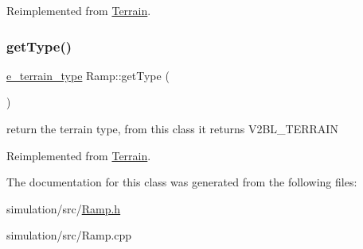 Reimplemented from \mbox{\hyperlink{class_terrain_a10fcf414cba83e769d99156fe16aa795}{Terrain}}.

\mbox{\label{class_ramp_a25dce9bce336a8524be1de1abd6f1af3}} 
\subsubsection{\texorpdfstring{get\+Type()}{getType()}}
{\footnotesize\ttfamily \mbox{\hyperlink{_terrain_8h_a6d0b7e83bb7325270c1162bece970fd8}{e\+\_\+terrain\+\_\+type}} Ramp\+::get\+Type (\begin{DoxyParamCaption}{ }\end{DoxyParamCaption})\hspace{0.3cm}{\ttfamily [virtual]}}

return the terrain type, from this class it returns V2\+B\+L\+\_\+\+T\+E\+R\+R\+A\+IN 

Reimplemented from \mbox{\hyperlink{class_terrain_a6cd1220b8e64466cc7a2219efff4141b}{Terrain}}.



The documentation for this class was generated from the following files\+:\begin{DoxyCompactItemize}
\item 
simulation/src/\mbox{\hyperlink{_ramp_8h}{Ramp.\+h}}\item 
simulation/src/Ramp.\+cpp\end{DoxyCompactItemize}
